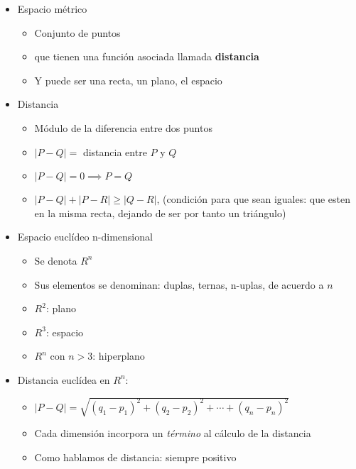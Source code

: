 \begin{itemize}
    \item Espacio métrico
          \begin{itemize}
              \item Conjunto de puntos
              \item que tienen una función asociada llamada \textbf{distancia}
              \item Y puede ser una recta, un plano, el espacio
          \end{itemize}
    \item Distancia
          \begin{itemize}
              \item Módulo de la diferencia entre dos puntos
              \item \(|P-Q| =\) distancia entre \(P\) y \(Q\)
              \item \(|P-Q| = 0 \implies P = Q\)
              \item \(|P-Q| + |P-R| \geq |Q-R|\),
                    (condición para que sean iguales:
                    que esten en la misma recta,
                    dejando de ser por tanto un triángulo)
          \end{itemize}
    \item Espacio euclídeo n-dimensional
          \begin{itemize}
              \item Se denota \(R^{n}\)
              \item Sus elementos se denominan: duplas, ternas, n-uplas,
                    de acuerdo a \(n\)
              \item \(R^{2}\): plano
              \item \(R^{3}\): espacio
              \item \(R^{n}\) con \(n>3\): hiperplano
          \end{itemize}
    \item Distancia euclídea en \(R^{n}\):
          \begin{itemize}
              \item \(|P-Q| = \sqrt{(q_1-p_1)^{2} + (q_2-p_2)^{2} + \cdots + (q_n-p_n)^{2}}\)
              \item Cada dimensión incorpora un \textit{término} al cálculo de la
                    distancia
              \item Como hablamos de distancia: siempre positivo
          \end{itemize}
\end{itemize}

